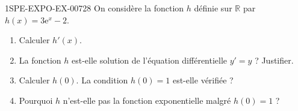 \begin{exercice}{1SPE-EXPO-EX-007}{2}{8}
On considère la fonction $h$ définie sur $\mathbb{R}$ par $h(x) = 3\mathrm{e}^x - 2$.
\begin{enumerate}
\item Calculer $h'(x)$.
\item La fonction $h$ est-elle solution de l'équation différentielle $y' = y$ ? Justifier.
\item Calculer $h(0)$. La condition $h(0) = 1$ est-elle vérifiée ?
\item Pourquoi $h$ n'est-elle pas la fonction exponentielle malgré $h(0) = 1$ ?
\end{enumerate}
\end{exercice}
